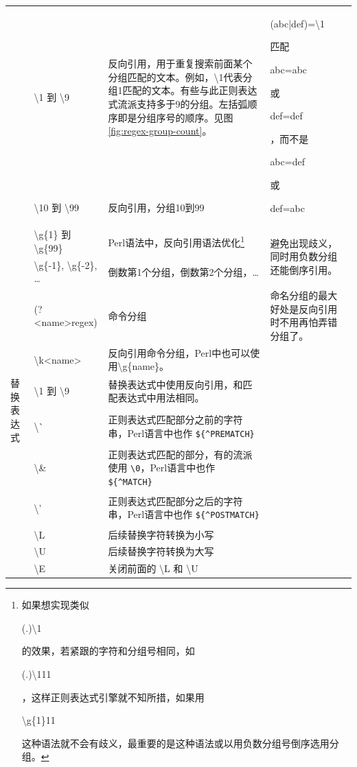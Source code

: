 \documentclass[12pt,a4paper,twoside]{ctexart}
\newcommand{\cbregex}[1]{\colorbox{orange!18}{\strut #1}}
\newcommand{\cbmatch}[1]{\colorbox{cyan!35}{\strut #1}}
\newcommand{\cbstring}[1]{\colorbox{green!20}{\strut #1}}
\begin{document}
\begin{center}
\begin{longtable}{p{4em}p{8em}p{25em}p{18em}}
  & \textbackslash{}1 到 \textbackslash{}9 & 反向引用，用于重复搜索前面某个分组匹配的文本。例如，\textbackslash{}1代表分组1匹配的文本。有些与此正则表达式流派支持多于9的分组。左括弧顺序即是分组序号的顺序。见图\ref{fig:regex-group-count}。 & \multirow{2}{18em}{\cbregex{(abc|def)=\textbackslash{}1} 匹配 \cbmatch{abc=abc} 或 \cbmatch{def=def}，而不是 \cbstring{abc=def} 或 \cbstring{def=abc}} \\
  & \textbackslash{}10 到 \textbackslash{}99 & 反向引用，分组10到99 & \\
  & \textbackslash{}g\{1\} 到 \textbackslash{}g\{99\} & Perl语法中，反向引用语法优化\footnote{如果想实现类似\cbregex{(.)\textbackslash{}1}的效果，若紧跟的字符和分组号相同，如\cbregex{(.)\textbackslash{}111}，这样正则表达式引擎就不知所措，如果用\cbregex{\textbackslash{}g\{1\}11}这种语法就不会有歧义，最重要的是这种语法或以用负数分组号倒序选用分组。} & \multirow{2}{18em}{避免出现歧义，同时用负数分组还能倒序引用。} \\
  & \textbackslash{}g\{-1\}, \textbackslash{}g\{-2\}, \ldots & 倒数第1个分组，倒数第2个分组，\ldots & \\
  & (?<name>regex) & 命令分组 & 命名分组的最大好处是反向引用时不用再怕弄错分组了。 \\
  & \textbackslash{}k<name> & 反向引用命令分组，Perl中也可以使用\textbackslash{}g\{name\}。 & \\
  \midrule
  \multirow{2}{4em}{替换表达式} & \textbackslash{}1 到 \textbackslash{}9 & 替换表达式中使用反向引用，和匹配表达式中用法相同。 & \\
  & \cbregex{\textbackslash{}\`{}} & 正则表达式匹配部分之前的字符串，Perl语言中也作 \verb=${^PREMATCH}= & \\
  & \cbregex{\textbackslash{}\&} & 正则表达式匹配的部分，有的流派使用 \verb=\0=，Perl语言中也作 \verb=${^MATCH}= & \\
  & \cbregex{\textbackslash{}'} & 正则表达式匹配部分之后的字符串，Perl语言中也作 \verb=${^POSTMATCH}= & \\
  & \textbackslash{}L & 后续替换字符转换为小写 & \\
  & \textbackslash{}U & 后续替换字符转换为大写 & \\
  & \textbackslash{}E & 关闭前面的 \textbackslash{}L 和 \textbackslash{}U & \\
\end{longtable}
\end{center}
\end{document}
